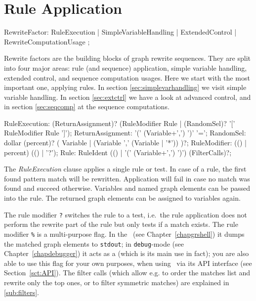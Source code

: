 \section{Rule Application} \label{sec:ruleapplication}

\begin{rail} 
  RewriteFactor: RuleExecution
     | SimpleVariableHandling
     | ExtendedControl
     | RewriteComputationUsage
	; 
\end{rail}

Rewrite factors are the building blocks of graph rewrite sequences.
They are split into four major areas: rule (and sequence) application, simple variable handling, extended control, and sequence computation usages.
Here we start with the most important one, applying rules.
In section \ref{sec:simplevarhandling} we visit simple variable handling.
In section \ref{sec:extctrl} we have a look at advanced control, and in section \ref{sec:seqcomp} at the sequence computations.

\begin{rail}
  RuleExecution: (ReturnAssignment)? (RuleModifier Rule | (RandomSel)? '[' RuleModifier Rule ']');
  ReturnAssignment: '(' (Variable+',') ')' '=';
  RandomSel: dollar (percent)? ( Variable | (Variable ',' (Variable | '*')) )?;
  RuleModifier: (() | percent) (() | '?');
  Rule: RuleIdent (() | '(' (Variable+',') ')') (FilterCalls)?;
\end{rail}

The \emph{RuleExecution} clause applies a single rule or test.
In case of a rule, the first found pattern match will be rewritten.
Application will fail in case no match was found and succeed otherwise. 
Variables and named graph elements can be passed into the rule.
The returned graph elements can be assigned to variables again.

The rule modifier \texttt{?} switches the rule to a test, i.e.\ the rule application does not perform the rewrite part of the rule but only tests if a match exists.
The rule modifier \texttt{\%} is a multi-purpose flag. 
In the \GrShell\ (see Chapter~\ref{chapgrshell}) it dumps the matched graph elements to \texttt{stdout};
in \texttt{debug}-mode (see Chapter~\ref{chapdebugger}) it acts as a  (which is its main use in fact);
you are also able to use this flag for your own purposes, when using \GrG\ via its API interface (see Section~\ref{sct:API}).
The filter calls (which allow e.g. to order the matches list and rewrite only the top ones, or to filter symmetric matches) are explained in \ref{sub:filters}.

